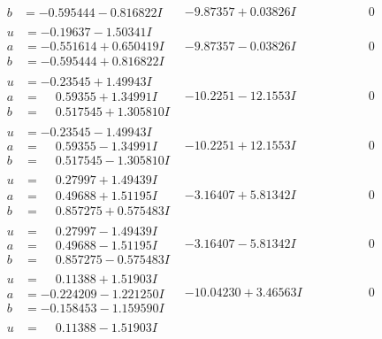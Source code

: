 \documentclass[1p]{elsarticle_modified}
\theoremstyle{definition}
\begin{document}
$$\begin{array}{c|c|c}
\begin{aligned}
b &= -0.595444 - 0.816822 I\end{aligned}
 & -9.87357 + 0.03826 I & \phantom{-0.000000 } 0 \\ \hline\begin{aligned}
u &= -0.19637 - 1.50341 I \\
a &= -0.551614 + 0.650419 I \\
b &= -0.595444 + 0.816822 I\end{aligned}
 & -9.87357 - 0.03826 I & \phantom{-0.000000 } 0 \\ \hline\begin{aligned}
u &= -0.23545 + 1.49943 I \\
a &= \phantom{-}0.59355 + 1.34991 I \\
b &= \phantom{-}0.517545 + 1.305810 I\end{aligned}
 & -10.2251 - 12.1553 I & \phantom{-0.000000 } 0 \\ \hline\begin{aligned}
u &= -0.23545 - 1.49943 I \\
a &= \phantom{-}0.59355 - 1.34991 I \\
b &= \phantom{-}0.517545 - 1.305810 I\end{aligned}
 & -10.2251 + 12.1553 I & \phantom{-0.000000 } 0 \\ \hline\begin{aligned}
u &= \phantom{-}0.27997 + 1.49439 I \\
a &= \phantom{-}0.49688 + 1.51195 I \\
b &= \phantom{-}0.857275 + 0.575483 I\end{aligned}
 & -3.16407 + 5.81342 I & \phantom{-0.000000 } 0 \\ \hline\begin{aligned}
u &= \phantom{-}0.27997 - 1.49439 I \\
a &= \phantom{-}0.49688 - 1.51195 I \\
b &= \phantom{-}0.857275 - 0.575483 I\end{aligned}
 & -3.16407 - 5.81342 I & \phantom{-0.000000 } 0 \\ \hline\begin{aligned}
u &= \phantom{-}0.11388 + 1.51903 I \\
a &= -0.224209 - 1.221250 I \\
b &= -0.158453 - 1.159590 I\end{aligned}
 & -10.04230 + 3.46563 I & \phantom{-0.000000 } 0 \\ \hline\begin{aligned}
u &= \phantom{-}0.11388 - 1.51903 I \\

\end{aligned}
\end{array}$$
\end{document}
